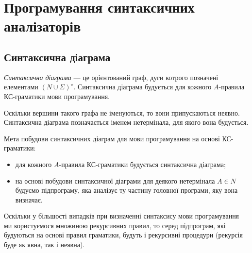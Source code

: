\setcounter{section}{10}

\section{Програмування синтаксичних аналізаторів}

\subsection{Синтаксична діаграма}

\textit{Синтаксична діаграма} --- це орієнтований граф, дуги котрого позначені елементами $(N \cup \Sigma)^\star$. Синтаксична діаграма будується для кожного $A$-правила КС-граматики мови програмування. \medskip

Оскільки вершини такого графа не іменуються, то вони припускаються неявно. Синтаксична діаграма позначається іменем нетермінала, для якого вона будується. \medskip

Мета побудови синтаксичних діаграм для мови програмування на основі КС-граматики:
\begin{itemize}
	\item для кожного $A$-правила КС-граматики будується синтаксична діаграма;
	\item на основі побудови синтаксичної діаграми для деякого нетермінала $A \in N$ будуємо підпрограму, яка аналізує ту частину головної програми, яку вона визначає.
\end{itemize}

Оскільки у більшості випадків при визначенні синтаксису мови програмування ми користуємося множиною рекурсивних правил, то серед підпрограм, які будуються на основі правил граматики, будуть і рекурсивні процедури (рекурсія буде як явна, так і неявна). \medskip

